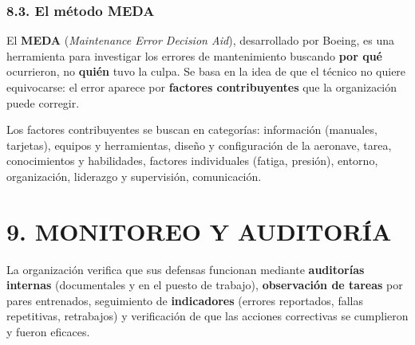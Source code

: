 \subsubsection*{8.3. El método MEDA}
El \textbf{MEDA} (\textit{Maintenance Error Decision Aid}), desarrollado por Boeing, es una
herramienta para investigar los errores de mantenimiento buscando \textbf{por qué} ocurrieron, no
\textbf{quién} tuvo la culpa. Se basa en la idea de que el técnico no quiere equivocarse: el error
aparece por \textbf{factores contribuyentes} que la organización puede corregir.

\begin{center}
\end{center}
Los factores contribuyentes se buscan en categorías: información (manuales, tarjetas), equipos y
herramientas, diseño y configuración de la aeronave, tarea, conocimientos y habilidades, factores
individuales (fatiga, presión), entorno, organización, liderazgo y supervisión, comunicación.

\section*{9. MONITOREO Y AUDITORÍA}
La organización verifica que sus defensas funcionan mediante \textbf{auditorías internas}
(documentales y en el puesto de trabajo), \textbf{observación de tareas} por pares entrenados,
seguimiento de \textbf{indicadores} (errores reportados, fallas repetitivas, retrabajos) y
verificación de que las acciones correctivas se cumplieron y fueron eficaces.

